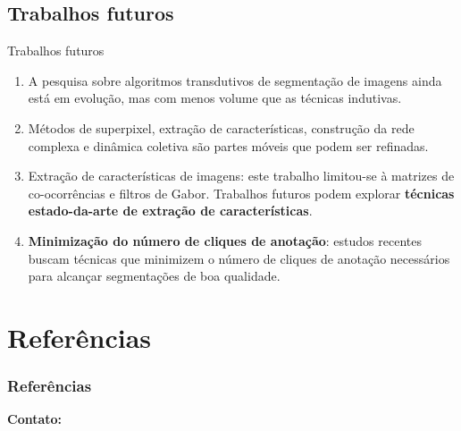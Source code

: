 \documentclass{templatebeamerufc/libs/ufc_format}
\begin{document}
\subsection{Trabalhos futuros}
\begin{frame}{Trabalhos futuros}
  \begin{enumerate}[<+->]
  \item A pesquisa sobre algoritmos transdutivos de segmentação de
imagens ainda está em evolução, mas com menos volume que as técnicas
indutivas.

  \item Métodos de superpixel, extração de características, construção
da rede complexa e dinâmica coletiva são partes móveis que podem ser
refinadas.

  \item Extração de características de imagens: este trabalho
limitou-se à matrizes de co-ocorrências e filtros de Gabor. Trabalhos
futuros podem explorar \textbf{técnicas estado-da-arte de extração de
características}.

\item \textbf{Minimização do número de cliques de anotação}: estudos recentes~\cite{chen2022focalclick}
  buscam técnicas que minimizem o número de cliques de anotação
  necessários para alcançar segmentações de boa qualidade.


  \end{enumerate}
\end{frame}


\section{Referências}
\begin{frame}[t, allowframebreaks]
  \frametitle{Referências}
  

\end{frame}

\begin{frame}{}
    \centering
    \huge{\textbf{}}

    \vspace{1cm}

    \Large{\textbf{Contato:}}
    \newline
    \vspace*{0.5cm}
    \large{}
\end{frame}
\end{document}
